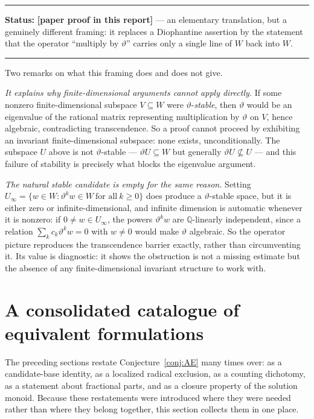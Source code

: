 \documentclass[11pt,oneside]{article}
\theoremstyle{definition}
\theoremstyle{remark}
\newcommand{\Q}{\mathbb Q}
\newcommand{\thetaq}{\vartheta}
\newcommand{\statusnew}{\textcolor{newgreen}{\textbf{[paper proof in this report]}}}
\newenvironment{statusbox}[1]
{\begin{center}\begin{minipage}{0.94\textwidth}\raggedright\hbadness=10000\hrule
\vspace{0.45em}\textbf{Status:} #1\par\vspace{0.35em}}
{\vspace{0.35em}\hrule\end{minipage}\end{center}}
\begin{document}
\begin{statusbox}{\statusnew{} --- an elementary translation, but a genuinely different
framing: it replaces a Diophantine assertion by the statement that the operator ``multiply by
$\thetaq$'' carries only a single line of $W$ back into $W$.}
\end{statusbox}

Two remarks on what this framing does and does not give.

\emph{It explains why finite-dimensional arguments cannot apply directly.}  If some nonzero
finite-dimensional subspace $V\subseteq W$ were $\thetaq$-\emph{stable}, then $\thetaq$ would
be an eigenvalue of the rational matrix representing multiplication by $\thetaq$ on $V$, hence
algebraic, contradicting transcendence.  So a proof cannot proceed by exhibiting an invariant
finite-dimensional subspace: none exists, unconditionally.  The subspace $U$ above is not
$\thetaq$-stable --- $\thetaq U\subseteq W$ but generally $\thetaq U\not\subseteq U$ --- and
this failure of stability is precisely what blocks the eigenvalue argument.

\emph{The natural stable candidate is empty for the same reason.}  Setting
$U_\infty=\{w\in W:\thetaq^{k}w\in W\ \text{for all}\ k\ge0\}$ does produce a
$\thetaq$-stable space, but it is either zero or infinite-dimensional, and infinite dimension
is automatic whenever it is nonzero: if $0\ne w\in U_\infty$, the powers $\thetaq^{k}w$ are
$\Q$-linearly independent, since a relation $\sum_kc_k\thetaq^{k}w=0$ with $w\ne0$ would make
$\thetaq$ algebraic.  So the operator picture reproduces the transcendence barrier exactly,
rather than circumventing it.  Its value is diagnostic: it shows the obstruction is not a
missing estimate but the absence of any finite-dimensional invariant structure to work with.

\section{A consolidated catalogue of equivalent formulations}\label{sec:catalogue}

The preceding sections restate Conjecture~\ref{conj:AE} many times over: as a candidate-base
identity, as a localized radical exclusion, as a counting dichotomy, as a statement about
fractional parts, and as a closure property of the solution monoid.  Because these
restatements were introduced where they were needed rather than where they belong together,
this section collects them in one place.
\end{document}
